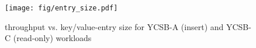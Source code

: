 
\begin{figure}
\centering
      \texttt{[image: fig/entry\_size.pdf]}
\caption{throughput vs. key/value-entry size for YCSB-A (insert) and YCSB-C (read-only) workloads}
             \label{fig:microbenchmarks-d}
\end{figure}






